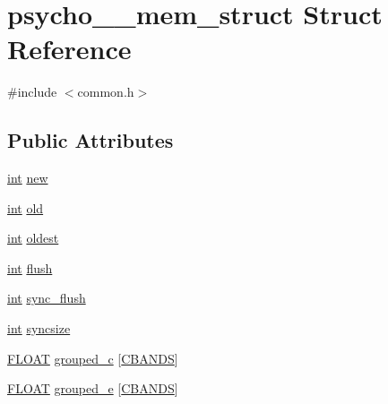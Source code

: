\hypertarget{structpsycho__4__mem__struct}{}\section{psycho\+\_\+\_\+mem\+\_\+struct Struct Reference}
\label{structpsycho__4__mem__struct}


{\ttfamily \#include $<$common.\+h$>$}

\subsection*{Public Attributes}
\begin{DoxyCompactItemize}
\item 
\hyperlink{xmltok_8h_a5a0d4a5641ce434f1d23533f2b2e6653}{int} \hyperlink{structpsycho__4__mem__struct_a2426debb5736e2849a2e10410a5b2836}{new}
\item 
\hyperlink{xmltok_8h_a5a0d4a5641ce434f1d23533f2b2e6653}{int} \hyperlink{structpsycho__4__mem__struct_aa418be00038817732da782b827154044}{old}
\item 
\hyperlink{xmltok_8h_a5a0d4a5641ce434f1d23533f2b2e6653}{int} \hyperlink{structpsycho__4__mem__struct_a555b66decbf67bb6c62d4002c6cd9e54}{oldest}
\item 
\hyperlink{xmltok_8h_a5a0d4a5641ce434f1d23533f2b2e6653}{int} \hyperlink{structpsycho__4__mem__struct_a04e8375be3f1369a11b55979ee86a005}{flush}
\item 
\hyperlink{xmltok_8h_a5a0d4a5641ce434f1d23533f2b2e6653}{int} \hyperlink{structpsycho__4__mem__struct_a30bc4054aa34b1a7159888e0e6739bc2}{sync\+\_\+flush}
\item 
\hyperlink{xmltok_8h_a5a0d4a5641ce434f1d23533f2b2e6653}{int} \hyperlink{structpsycho__4__mem__struct_a9a6176669add5d8d80ca1c4c28848f72}{syncsize}
\item 
\hyperlink{twolame_2libtwolame_2common_8h_ae8690abbffa85934d64d545920e2b108}{F\+L\+O\+AT} \hyperlink{structpsycho__4__mem__struct_a269e1259ce6539d93528320edb6e9682}{grouped\+\_\+c} \mbox{[}\hyperlink{twolame_2libtwolame_2common_8h_aac671256f124a8c00bd22ac15a337d0d}{C\+B\+A\+N\+DS}\mbox{]}
\item 
\hyperlink{twolame_2libtwolame_2common_8h_ae8690abbffa85934d64d545920e2b108}{F\+L\+O\+AT} \hyperlink{structpsycho__4__mem__struct_aec998268cf8863f5a8fcd48f2bf6e668}{grouped\+\_\+e} \mbox{[}\hyperlink{twolame_2libtwolame_2common_8h_aac671256f124a8c00bd22ac15a337d0d}{C\+B\+A\+N\+DS}\mbox{]}
\item 

\end{DoxyCompactItemize}
